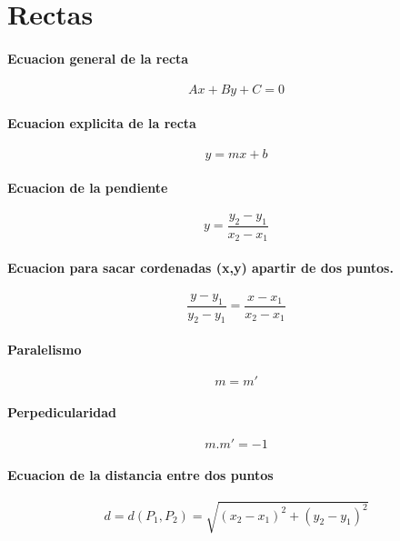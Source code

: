 \documentclass[a4paper]{article}
\begin{document}
\section{Rectas}

\paragraph{Ecuacion general de la recta}
	\begin{equation}
		Ax + By + C = 0
	\end{equation}

\paragraph{Ecuacion explicita de la recta}
	\begin{equation}
		y = mx + b
	\end{equation}

\paragraph{Ecuacion  de la pendiente}
	\begin{equation}
		y ={\frac{y_2 - y_1}{x_2 - x_1}}
	\end{equation}

\paragraph{Ecuacion para sacar cordenadas (x,y) apartir de dos puntos.}
	\begin{equation}
		\frac{y-y_1}{y_2 - y_1} = \frac{x-x_1}{x_2 - x_1}
	\end{equation}
\paragraph{Paralelismo}
	\begin{equation}
 		m = m'  
	\end{equation}
\paragraph{Perpedicularidad}
	\begin{equation}
 		m.m' = -1
	\end{equation}

\paragraph{Ecuacion de la distancia entre dos puntos}
	\begin{equation}
		d=d(P_1,P_2)=\sqrt{(x_2 - x_1)^{2} + (y_2 - y_1)^{2}}
	\end{equation}
\end{document}

